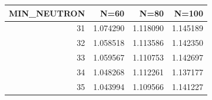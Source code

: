 \begin{tabular}{rrrr}
\toprule
MIN_NEUTRON & N=60 & N=80 & N=100 \\
\midrule
31 & 1.074290 & 1.118090 & 1.145189 \\
32 & 1.058518 & 1.113586 & 1.142350 \\
33 & 1.059567 & 1.110753 & 1.142697 \\
34 & 1.048268 & 1.112261 & 1.137177 \\
35 & 1.043994 & 1.109566 & 1.141227 \\
\bottomrule
\end{tabular}